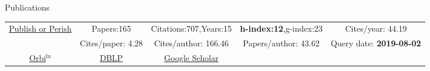 \begin{rubrique}{Publications}

  {\footnotesize

    \vspace*{-2em}
    \begin{center}
      \begin{tabular}{|c||cccc|}
        \hline
        \multirow{2}{4em}{\href{http://www.harzing.com/pop.htm}{Publish or Perish}}
        & Papers:165        & Citations:707,Years:15   & \textbf{h-index:12},g-index:23 & Cites/year: 44.19\\
        & Cites/paper: 4.28 & Cites/author: 166.46 & Papers/author: 43.62 & Query date: \textbf{2019-08-02}\\
        \hline
        \href{https://orbilu.uni.lu/simple-search?query=varrette}{Orbi$^\text{lu}$} &
        \multicolumn{1}{c|}{\href{http://www.informatik.uni-trier.de/~ley/pers/hd/v/Varrette:S=eacute=bastien.html}{DBLP}} &                                                                                                \multicolumn{1}{c|}{\href{https://scholar.google.fr/citations?hl=fr\&user=6PTStIcAAAAJ\&view_op=list_works\&sortby=pubdate}{Google Scholar}}\\
        \cline{1-3}
      \end{tabular}
    \end{center}
  }




\end{rubrique}





%
